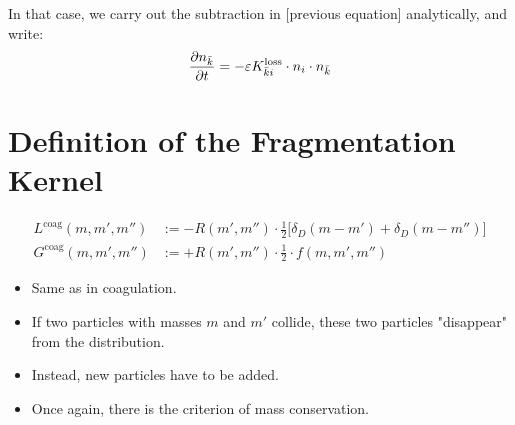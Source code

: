         In that case, we carry out the subtraction in [previous equation] analytically, and write:
        \begin{equation}
            \frac{\partial n_{\bar k}}{\partial t}
                =-\varepsilon K_{\bar ki}^{\text{loss}}\cdot n_i\cdot n_{\bar k}
        \end{equation}
    
        


    \clearpage

    \clearpage


\section{Definition of the Fragmentation Kernel}

    \begin{align}
        L^\text{coag}(m, m', m'') 
            &:= -R(m',m'') \cdot \frac{1}{2} \bigg[\delta_D(m-m')+\delta_D(m-m'')\bigg] \\
        G^\text{coag}(m, m', m'') 
            &:= +R(m',m'') \cdot \frac{1}{2} \cdot f(m,m',m'')
    \end{align}

    \begin{itemize}
        \item Same as in coagulation.
        \item If two particles with masses $m$ and $m'$ collide, these two particles "disappear"
              from the distribution.
        \item Instead, new particles have to be added.
        \item Once again, there is the criterion of mass conservation.
    \end{itemize}

